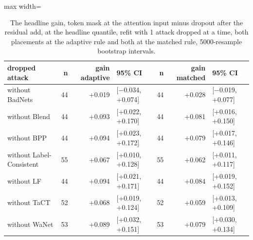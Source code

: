 \begin{table}[htbp]
\centering
\small
\caption{The headline gain, token mask at the attention input minus dropout after the residual add, at the headline quantile, refit with 1 attack dropped at a time, both placements at the adaptive rule and both at the matched rule, 5000-resample bootstrap intervals.}
\label{tab:headline-loo}
\begin{adjustbox}{max width=\linewidth}
\begin{tabular}{lrrlrrl}
\toprule
dropped attack & n & gain adaptive & 95\% CI & n & gain matched & 95\% CI \\
\midrule
without BadNets & 44 & +0.019 & [$-$0.034, +0.074] & 44 & +0.028 & [$-$0.019, +0.077] \\
without Blend & 44 & +0.093 & [+0.022, +0.170] & 44 & +0.081 & [+0.016, +0.150] \\
without BPP & 44 & +0.094 & [+0.023, +0.172] & 44 & +0.079 & [+0.017, +0.146] \\
without Label-Consistent & 55 & +0.067 & [+0.010, +0.128] & 55 & +0.062 & [+0.011, +0.117] \\
without LF & 44 & +0.094 & [+0.021, +0.171] & 44 & +0.084 & [+0.019, +0.152] \\
without TaCT & 52 & +0.068 & [+0.019, +0.124] & 52 & +0.059 & [+0.013, +0.109] \\
without WaNet & 53 & +0.089 & [+0.032, +0.151] & 53 & +0.079 & [+0.030, +0.134] \\
\bottomrule
\end{tabular}
\end{adjustbox}
\end{table}
